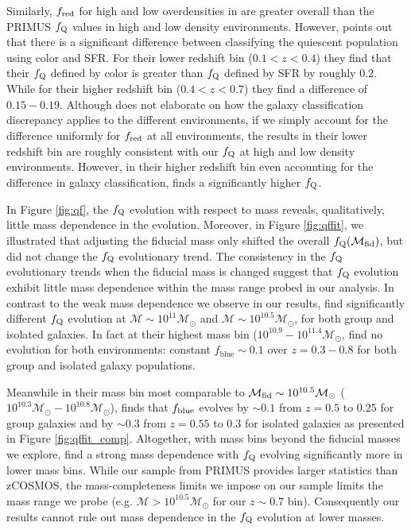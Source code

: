 \documentclass{emulateapj}
\begin{document}
Similarly, $f_{\rm{red}}$ for high and low overdensities in
\cite{Kovac:2014aa} are  greater overall than the PRIMUS $f_{\rm{Q}}$
values in high and low density environments. However,
\cite{Kovac:2014aa} points out that there is a significant difference
between classifying the quiescent population using color and SFR. For their lower redshift bin ($0.1 < z < 0.4$) they find that their $f_{\rm{Q}}$ defined by color is greater than $f_{\rm{Q}}$ defined by SFR by roughly $0.2$. While for their higher redshift bin ($0.4 < z < 0.7$) they find a difference of $0.15-0.19$. Although \cite{Kovac:2014aa} does not elaborate on how the galaxy classification discrepancy applies to the different environments, if we simply account for the difference uniformly for $f_{\rm{red}}$ at all environments, the \cite{Kovac:2014aa} results in their lower redshift bin are roughly consistent with our $f_{\rm{Q}}$ at high and low density environments. However, in their higher redshift bin even accounting for the difference in galaxy classification, \cite{Kovac:2014aa} finds a significantly higher $f_{\rm{Q}}$. 

In Figure \ref{fig:qf}, the $f_{\rm{Q}}$ evolution with respect to
mass reveals, qualitatively, little mass dependence in the
evolution. Moreover, in Figure \ref{fig:qffit}, we illustrated that
adjusting the fiducial mass only shifted the overall
$f_{\rm{Q}}(\mathcal{M}_{\rm{fid}})$, but did not change the
$f_{\rm{Q}}$ evolutionary trend. The consistency in the $f_{\rm{Q}}$
evolutionary trends when the fiducial mass is changed suggest that
$f_{\rm{Q}}$ evolution exhibit little mass dependence within the 
mass range probed in our analysis. In contrast to
the weak mass dependence we observe in our results,
\cite{Iovino:2010aa} find significantly different $f_{\rm{Q}}$
evolution at $\mathcal{M} \sim 10^{11} \mathcal{M}_{\odot}$ and
$\mathcal{M} \sim 10^{10.5} \mathcal{M}_{\odot}$, for both group and
isolated galaxies. In fact at their highest mass bin ($10^{10.9} -
10^{11.4} \mathcal{M}_{\odot}$, \cite{Iovino:2010aa} find no evolution
for both environments: constant $f_{\mathrm{blue}} \sim 0.1$ over $z =
0.3 - 0.8$ for both group and isolated galaxy populations.

Meanwhile in their mass bin most comparable to $\mathcal{M}_{\rm{fid}}
\sim 10^{10.5} \mathcal{M}_{\odot}$ ($10^{10.3} \mathcal{M}_{\odot} -
10^{10.8} \mathcal{M}_{\odot}$), \cite{Iovino:2010aa} finds that
$f_{\rm{blue}}$ evolves by $\sim 0.1$ from $z = 0.5$ to $0.25$ for
group galaxies and by $\sim 0.3$ from $z=0.55$ to $0.3$ for isolated
galaxies as presented in Figure \ref{fig:qffit_comp}. Altogether, with
mass bins beyond the fiducial masses we explore, \cite{Iovino:2010aa}
find a strong mass dependence with $f_{\rm{Q}}$ evolving significantly
more in lower mass bins. While our sample from PRIMUS provides larger
statistics than zCOSMOS, the mass-completeness limits we impose on our
sample limits the mass range we probe (e.g. $\mathcal{M} > 10^{10.5}
\mathcal{M}_{\odot}$ for our $z \sim 0.7$ bin). Consequently our
results cannot rule out mass dependence in the $f_{\rm{Q}}$ evolution
at lower masses.
\end{document}

